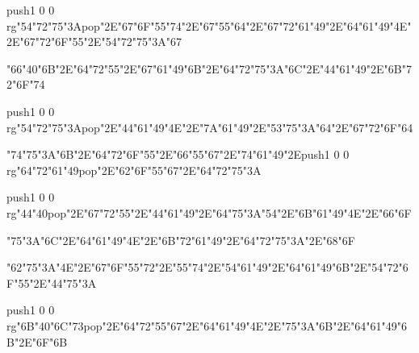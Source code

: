 \centerline{\pdfcolorstack\match push{1 0 0 rg}\ipa\char"54\ipa\char"72\ipa\char"75\ipa\char"3A\pdfcolorstack\match pop{}\ipa\char"2E\ipa\char"67\ipa\char"6F\ipa\char"55\ipa\char"74\ipa\char"2E\ipa\char"67\ipa\char"55\ipa\char"64\ipa\char"2E\ipa\char"67\ipa\char"72\ipa\char"61\ipa\char"49\ipa\char"2E\ipa\char"64\ipa\char"61\ipa\char"49\ipa\char"4E\ipa\char"2E\ipa\char"67\ipa\char"72\ipa\char"6F\ipa\char"55\ipa\char"2E\ipa\char"54\ipa\char"72\ipa\char"75\ipa\char"3A\ipa\char"67}\bigskip
\centerline{\ipa\char"66\ipa\char"40\ipa\char"6B\ipa\char"2E\ipa\char"64\ipa\char"72\ipa\char"55\ipa\char"2E\ipa\char"67\ipa\char"61\ipa\char"49\ipa\char"6B\ipa\char"2E\ipa\char"64\ipa\char"72\ipa\char"75\ipa\char"3A\ipa\char"6C\ipa\char"2E\ipa\char"44\ipa\char"61\ipa\char"49\ipa\char"2E\ipa\char"6B\ipa\char"72\ipa\char"6F\ipa\char"74}\vfill\eject
\null\vfill
\centerline{\pdfcolorstack\match push{1 0 0 rg}\ipa\char"54\ipa\char"72\ipa\char"75\ipa\char"3A\pdfcolorstack\match pop{}\ipa\char"2E\ipa\char"44\ipa\char"61\ipa\char"49\ipa\char"4E\ipa\char"2E\ipa\char"7A\ipa\char"61\ipa\char"49\ipa\char"2E\ipa\char"53\ipa\char"75\ipa\char"3A\ipa\char"64\ipa\char"2E\ipa\char"67\ipa\char"72\ipa\char"6F\ipa\char"64}\bigskip
\centerline{\ipa\char"74\ipa\char"75\ipa\char"3A\ipa\char"6B\ipa\char"2E\ipa\char"64\ipa\char"72\ipa\char"6F\ipa\char"55\ipa\char"2E\ipa\char"66\ipa\char"55\ipa\char"67\ipa\char"2E\ipa\char"74\ipa\char"61\ipa\char"49\ipa\char"2E\pdfcolorstack\match push{1 0 0 rg}\ipa\char"64\ipa\char"72\ipa\char"61\ipa\char"49\pdfcolorstack\match pop{}\ipa\char"2E\ipa\char"62\ipa\char"6F\ipa\char"55\ipa\char"67\ipa\char"2E\ipa\char"64\ipa\char"72\ipa\char"75\ipa\char"3A}\bigskip
\centerline{\pdfcolorstack\match push{1 0 0 rg}\ipa\char"44\ipa\char"40\pdfcolorstack\match pop{}\ipa\char"2E\ipa\char"67\ipa\char"72\ipa\char"55\ipa\char"2E\ipa\char"44\ipa\char"61\ipa\char"49\ipa\char"2E\ipa\char"64\ipa\char"75\ipa\char"3A\ipa\char"54\ipa\char"2E\ipa\char"6B\ipa\char"61\ipa\char"49\ipa\char"4E\ipa\char"2E\ipa\char"66\ipa\char"6F}\vfill\eject
\null\vfill
\centerline{\ipa\char"75\ipa\char"3A\ipa\char"6C\ipa\char"2E\ipa\char"64\ipa\char"61\ipa\char"49\ipa\char"4E\ipa\char"2E\ipa\char"6B\ipa\char"72\ipa\char"61\ipa\char"49\ipa\char"2E\ipa\char"64\ipa\char"72\ipa\char"75\ipa\char"3A\ipa\char"2E\ipa\char"68\ipa\char"6F}\bigskip
\centerline{\ipa\char"62\ipa\char"75\ipa\char"3A\ipa\char"4E\ipa\char"2E\ipa\char"67\ipa\char"6F\ipa\char"55\ipa\char"72\ipa\char"2E\ipa\char"55\ipa\char"74\ipa\char"2E\ipa\char"54\ipa\char"61\ipa\char"49\ipa\char"2E\ipa\char"64\ipa\char"61\ipa\char"49\ipa\char"6B\ipa\char"2E\ipa\char"54\ipa\char"72\ipa\char"6F\ipa\char"55\ipa\char"2E\ipa\char"44\ipa\char"75\ipa\char"3A}\bigskip
\centerline{\pdfcolorstack\match push{1 0 0 rg}\ipa\char"6B\ipa\char"40\ipa\char"6C\ipa\char"73\pdfcolorstack\match pop{}\ipa\char"2E\ipa\char"64\ipa\char"72\ipa\char"55\ipa\char"67\ipa\char"2E\ipa\char"64\ipa\char"61\ipa\char"49\ipa\char"4E\ipa\char"2E\ipa\char"75\ipa\char"3A\ipa\char"6B\ipa\char"2E\ipa\char"64\ipa\char"61\ipa\char"49\ipa\char"6B\ipa\char"2E\ipa\char"6F\ipa\char"6B}\vfill\eject
